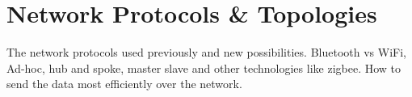 \section{Network Protocols \& Topologies}
The network protocols used previously and new possibilities. Bluetooth vs WiFi, Ad-hoc, hub and spoke, master slave and other technologies like zigbee. How to send the data most efficiently over the network.